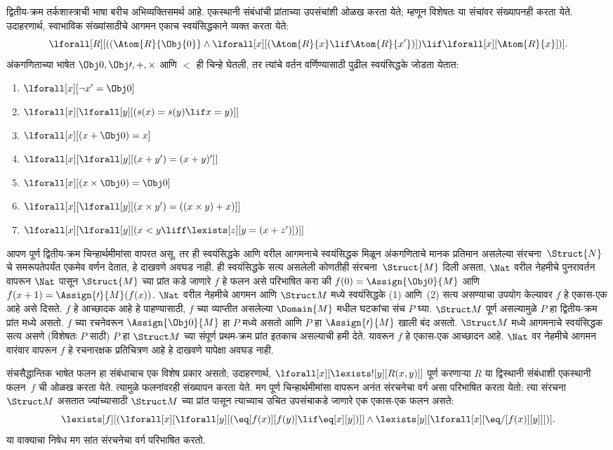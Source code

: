 द्वितीय-क्रम तर्कशास्त्राची भाषा बरीच अभिव्यक्तिसमर्थ आहे. एकस्थानी संबंधांची
प्रांताच्या उपसंचांशी ओळख करता येते; म्हणून विशेषतः या संचांवर संख्यापनही
करता येते. उदाहरणार्थ, स्वाभाविक संख्यांसाठीचे आगमन एकाच स्वयंसिद्धकाने
व्यक्त करता येते:
\[\lforall[R][((\Atom{R}{\Obj{0}} \land \lforall[x][(\Atom{R}{x} \lif
    \Atom{R}{x'})]) \lif \lforall[x][\Atom{R}{x}])].
\]
अंकगणिताच्या भाषेत $\Obj 0, \Obj \prime, +, \times$ आणि $<$ ही चिन्हे घेतली,
तर त्यांचे वर्तन वर्णिण्यासाठी पुढील स्वयंसिद्धके जोडता येतात:
\begin{enumerate}
\item $\lforall[x][\lnot x' = \Obj 0]$
\item $\lforall[x][\lforall[y][(s(x) = s(y) \lif x = y)]]$
\item $\lforall[x][(x + \Obj 0) = x]$
\item $\lforall[x][\lforall[y][(x + y') = (x + y)']]$
\item $\lforall[x][(x \times \Obj 0) = \Obj 0]$
\item $\lforall[x][\lforall[y][(x \times y') = ((x \times y) + x)]]$
\item $\lforall[x][\lforall[y][(x < y \liff \lexists[z][y = (x + z')])]]$
\end{enumerate}
आपण पूर्ण द्वितीय-क्रम चिन्हार्थमीमांसा वापरत असू, तर ही स्वयंसिद्धके आणि
वरील आगमनाचे स्वयंसिद्धक मिळून अंकगणिताचे मानक प्रतिमान असलेल्या
संरचना~$\Struct{N}$ चे समरूपतेपर्यंत एकमेव वर्णन देतात, हे दाखवणे
अवघड नाही. ही स्वयंसिद्धके सत्य असलेली कोणतीही संरचना~$\Struct{M}$
दिली असता, $\Nat$ वरील नेहमीचे पुनरावर्तन वापरून $\Nat$ पासून
$\Struct{M}$ च्या प्रांत कडे जाणारे $f$ हे फलन असे परिभाषित करा की
$f(0) = \Assign{\Obj 0}{M}$ आणि $f(x+1) = \Assign{\prime}{M}(f(x))$.
$\Nat$ वरील नेहमीचे आगमन आणि $\Struct M$ मध्ये स्वयंसिद्धके (1) आणि~(2)
सत्य असण्याचा उपयोग केल्यावर $f$ हे एकास-एक आहे असे दिसते. $f$ हे
आच्छादक आहे हे पाहण्यासाठी, $f$ च्या व्याप्तीत असलेल्या
$\Domain{M}$ मधील घटकांचा संच $P$ घ्या. $\Struct M$ पूर्ण असल्यामुळे $P$
हा द्वितीय-क्रम प्रांत मध्ये असतो. $f$ च्या रचनेवरून
$\Assign{\Obj 0}{M}$ हा $P$ मध्ये असतो आणि $P$ हा
$\Assign{\prime}{M}$ खाली बंद असतो. $\Struct M$ मध्ये आगमनाचे स्वयंसिद्धक
सत्य असणे (विशेषतः $P$ साठी) $P$ हा $\Struct M$ च्या संपूर्ण प्रथम-क्रम
प्रांत इतकाच असल्याची हमी देते. यावरून $f$ हे एकास-एक आच्छादन आहे.
$\Nat$ वर नेहमीचे आगमन वारंवार वापरून $f$ हे रचनारक्षक प्रतिचित्रण आहे हे
दाखवणे यापेक्षा अवघड नाही.

संचसैद्धान्तिक भाषेत फलन हा संबंधाचाच एक विशेष प्रकार असतो; उदाहरणार्थ,
$\lforall[x][\lexists![y][R(x,y)]]$ पूर्ण करणाऱ्या $R$ या द्विस्थानी
संबंधाशी एकस्थानी फलन~$f$ ची ओळख करता येते. त्यामुळे फलनांवरही संख्यापन करता
येते. मग पूर्ण चिन्हार्थमीमांसा वापरून अनंत संरचनेचा वर्ग असा
परिभाषित करता येतो: त्या संरचना $\Struct M$ असतात ज्यांच्यासाठी
$\Struct M$ च्या प्रांत पासून त्याच्याच उचित उपसंचाकडे जाणारे एक
एकास-एक फलन असते:
\[\lexists[f][(\lforall[x][\lforall[y][(\eq[f(x)][f(y)] \lif \eq[x][y])]]
  \land \lexists[y][\lforall[x][\eq/[f(x)][y]]])].
\]
या वाक्याचा निषेध मग सांत संरचनेचा वर्ग परिभाषित करतो.

